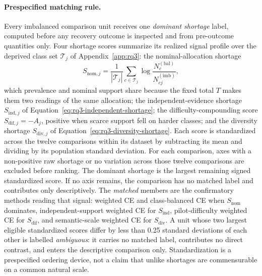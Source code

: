 \documentclass[11pt]{article}
\begin{document}
\paragraph{Prespecified matching rule.}
Every imbalanced comparison unit receives one \emph{dominant shortage} label, computed before any recovery outcome is inspected and from pre-outcome quantities only. Four shortage scores summarize its realized signal profile over the deprived class set $\mathcal T_j$ of Appendix~\ref{app:rq3}: the nominal-allocation shortage
\begin{equation}
  S_{\mathrm{nom},j}=\frac{1}{|\mathcal T_j|}\sum_{c\in\mathcal T_j}
  \log\frac{N^{(\mathrm{bal})}_{c}}{N^{(\mathrm{imb})}_{cj}},
  \label{eq:nominal-shortage}
\end{equation}
\noindent which prevalence and nominal support share because the fixed total $T$ makes them two readings of the same allocation; the independent-evidence shortage $S_{\mathrm{ind},j}$ of Equation~\eqref{eq:rq3-independent-shortage}; the difficulty-compounding score $S_{\mathrm{dif},j}=-A_j$, positive when scarce support fell on harder classes; and the diversity shortage $S_{\mathrm{div},j}$ of Equation~\eqref{eq:rq3-diversity-shortage}. Each score is standardized across the twelve comparisons within its dataset by subtracting its mean and dividing by its population standard deviation. For each comparison, axes with a non-positive raw shortage or no variation across those twelve comparisons are excluded before ranking. The dominant shortage is the largest remaining signed standardized score. If no axis remains, the comparison has no matched label and contributes only descriptively. The \emph{matched} members are the confirmatory methods reading that signal: weighted CE and class-balanced CE when $S_{\mathrm{nom}}$ dominates, independent-support weighted CE for $S_{\mathrm{ind}}$, pilot-difficulty weighted CE for $S_{\mathrm{dif}}$, and semantic-scale weighted CE for $S_{\mathrm{div}}$. A unit whose two largest eligible standardized scores differ by less than \num{0.25} standard deviations of each other is labelled \emph{ambiguous}: it carries no matched label, contributes no direct contrast, and enters the descriptive comparison only. Standardization is a prespecified ordering device, not a claim that unlike shortages are commensurable on a common natural scale.
\end{document}
